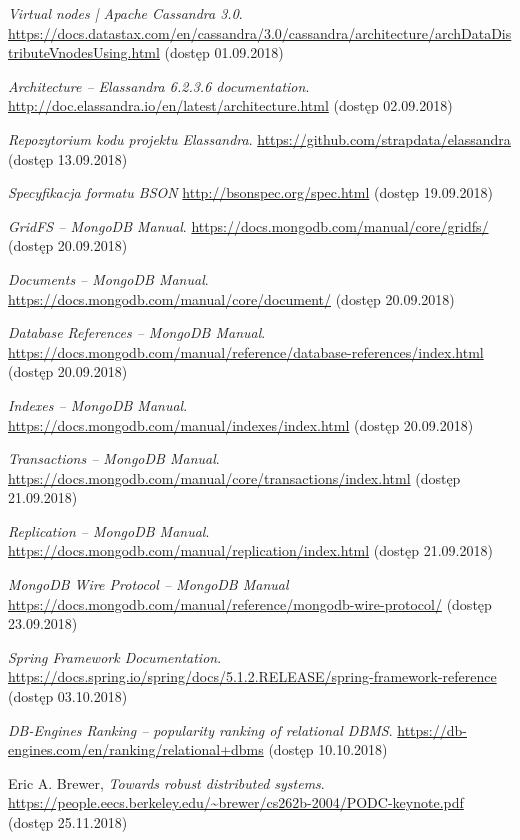 \begin{thebibliography}{54}
\emph{Virtual nodes | Apache Cassandra 3.0}. 
\url{https://docs.datastax.com/en/cassandra/3.0/cassandra/architecture/archDataDistributeVnodesUsing.html} (dostęp 01.09.2018)
    
\emph{Architecture -- Elassandra 6.2.3.6 documentation}. 
\url{http://doc.elassandra.io/en/latest/architecture.html} (dostęp 02.09.2018)
    
\emph{Repozytorium kodu projektu Elassandra}.
\url{https://github.com/strapdata/elassandra} (dostęp 13.09.2018)

\emph{Specyfikacja formatu BSON}
\url{http://bsonspec.org/spec.html} (dostęp 19.09.2018)

\emph{GridFS -- MongoDB Manual}. 
\url{https://docs.mongodb.com/manual/core/gridfs/} (dostęp 20.09.2018)

\emph{Documents -- MongoDB Manual}. 
\url{https://docs.mongodb.com/manual/core/document/} (dostęp 20.09.2018)

\emph{Database References -- MongoDB Manual}. 
\url{https://docs.mongodb.com/manual/reference/database-references/index.html} (dostęp 20.09.2018)

\emph{Indexes -- MongoDB Manual}. 
\url{https://docs.mongodb.com/manual/indexes/index.html} (dostęp 20.09.2018)

\emph{Transactions -- MongoDB Manual}. 
\url{https://docs.mongodb.com/manual/core/transactions/index.html} (dostęp 21.09.2018)

\emph{Replication -- MongoDB Manual}. 
\url{https://docs.mongodb.com/manual/replication/index.html} (dostęp 21.09.2018)

\emph{MongoDB Wire Protocol -- MongoDB Manual}
\url{https://docs.mongodb.com/manual/reference/mongodb-wire-protocol/}
(dostęp 23.09.2018)

\emph{Spring Framework Documentation}. 
\url{https://docs.spring.io/spring/docs/5.1.2.RELEASE/spring-framework-reference} (dostęp 03.10.2018)

\emph{DB-Engines Ranking -- popularity ranking of relational DBMS}.
\url{https://db-engines.com/en/ranking/relational+dbms} (dostęp 10.10.2018)

Eric A. Brewer,
\emph{Towards robust distributed systems}.
\url{https://people.eecs.berkeley.edu/~brewer/cs262b-2004/PODC-keynote.pdf} (dostęp 25.11.2018)
    
\end{thebibliography}
